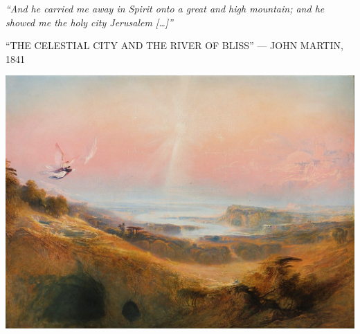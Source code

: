 \clearpage
\thispagestyle{empty}
\null\vfill
\settowidth{}
\begin{center}
\parbox{\longest}{%
  \raggedright{\huge\itshape%
    ``And he carried me away in Spirit onto a great and high mountain; and he showed me the holy city Jerusalem […]'' \par\bigskip
  }
  \raggedleft\Large\MakeUppercase{``The Celestial City and the River of Bliss'' — John Martin, 1841}\par%
}
\vfill\vfill
\clearpage\newpage
\end{center}
\newpage
\thispagestyle{empty}
\begin{center}
	\includegraphics[angle=90, width=1\textwidth]{images/illustrations/johnmartinnewjerusalem}
\end{center}